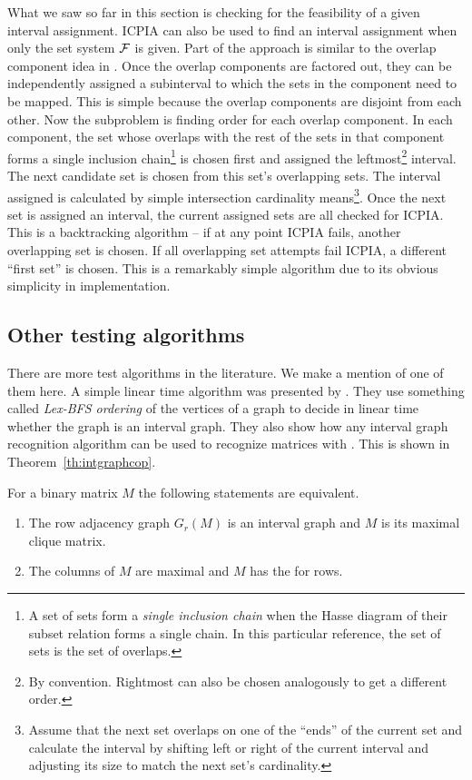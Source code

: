 What we saw so far in this section is checking for the feasibility of
a given interval assignment. ICPIA can also be used to find an
interval assignment when only the set system ${\cal F}$ is given. Part of
the approach is similar to the overlap component idea in \cite{fg65,
  wlh02}. Once the overlap components are factored out, they can be
independently assigned a subinterval to which the sets in the
component need to be mapped. This is simple because the overlap
components are disjoint from each other. Now the subproblem is finding
\COP order for each overlap component. In each component, the set
whose overlaps with the rest of the sets in that component forms
a single inclusion chain\footnote{A set of sets form a {\em single
  inclusion chain} when the Hasse diagram of their subset relation
forms a single chain. In this particular reference, the set of sets is
the set of overlaps.} is chosen first and assigned the
leftmost\footnote{By convention. Rightmost can also be chosen
  analogously to get a different \COP order.} interval. The next
candidate set is chosen from this set's overlapping sets. The interval
assigned is calculated by simple intersection cardinality
means\footnote{Assume that the next set overlaps on one of the
  ``ends'' of the current set and calculate the interval by shifting
  left or right of the current interval and adjusting its size to
  match the next set's cardinality.}. Once the next set is assigned an
interval, the current assigned sets are all checked for ICPIA. This is
a backtracking algorithm -- if at any point ICPIA fails, another
overlapping set is chosen. If all overlapping set attempts fail ICPIA,
a different ``first set'' is chosen. This is a remarkably simple
algorithm due to its obvious simplicity in implementation.

\subsection{Other \COP testing algorithms}
There are more \COP test algorithms in the literature. We make a
mention of one of them here.  A simple linear time algorithm was
presented by \cite{hmpv00}. They use something called {\em Lex-BFS
  ordering} of the vertices of a graph to decide in linear time
whether the graph is an interval graph. They also show how any
interval graph recognition algorithm can be used to recognize matrices
with \COP. This is shown in Theorem~\ref{th:intgraphcop}.

\begin{theoremsansproof}
  \label{th:intgraphcop}
  For a binary matrix $M$ the following statements are equivalent.
  \begin{enumerate}
  \item The row adjacency graph $G_r(M)$ is an interval graph and $M$
    is its maximal clique matrix.
  \item The columns of $M$ are maximal and $M$ has the \COP for rows.
  \end{enumerate}
\end{theoremsansproof}

